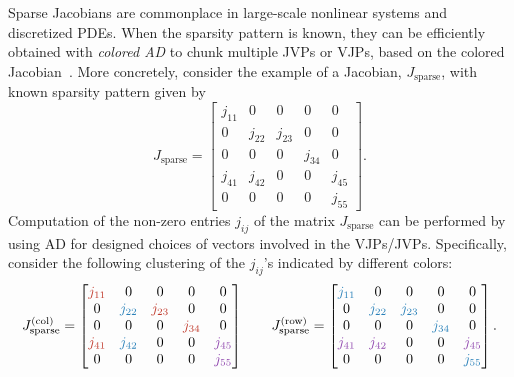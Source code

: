 Sparse Jacobians are commonplace in large-scale nonlinear systems and discretized PDEs. %
When the sparsity pattern is known, they can be efficiently obtained with \textit{colored AD} to chunk multiple JVPs or VJPs, based on the colored Jacobian~\cite{gebremedhin2005color}.
More concretely, consider the example of a Jacobian, ${J}_{\text{sparse}}$, with known sparsity pattern given by
\begin{equation}
    {J}_{\text{sparse}} = \begin{bmatrix}
        j_{11}  & 0       & 0       & 0       & 0       \\
        0       & j_{22}  & j_{23}  & 0       & 0       \\
        0       & 0       & 0       & j_{34}  & 0       \\
        j_{41}  & j_{42}  & 0       & 0       & j_{45}  \\
        0       & 0       & 0       & 0       & j_{55}
    \end{bmatrix}.
\end{equation}
Computation of the non-zero entries $j_{ij}$ of the matrix ${J}_{\text{sparse}}$ can be performed by using AD for designed choices of vectors involved in the VJPs/JVPs.
Specifically, consider the following clustering of the $j_{ij}$'s indicated by different colors:   
\begin{equation}
    {J}^{(\text{col})}_{\text{sparse}} = 
    \begin{bmatrix}
\color{myred}{j_{11}} & 0 & 0 & 0 & 0\\
0 & \color{myblue}{j_{22}} & \color{myred}{j_{23}} & 0 & 0 \\
0 & 0 & 0 & \color{myred}{j_{34}} & 0 \\
\color{myred}{j_{41}} & \color{myblue}{j_{42}} & 0 & 0 & \color{myviolet}{j_{45}} \\
0 & 0 & 0 & 0 & \color{myviolet}{j_{55}}
    \end{bmatrix} 
    \qquad 
    {J}^{(\text{row})}_{\text{sparse}} = 
    \begin{bmatrix}
\color{myblue}{j_{11}} & 0 & 0 & 0 & 0 \\
0 & \color{myblue}{j_{22}}  & \color{myblue}{j_{23}} & 0 & 0 \\
0 & 0 & 0 &\color{myblue}{j_{34}} & 0 \\
\color{myviolet}{j_{41}} & \color{myviolet}{j_{42}} & 0 & 0 & \color{myviolet}{j_{45}} \\
0 & 0 & 0 & 0 & \color{myblue}{j_{55}}
    \end{bmatrix}.
\end{equation}
